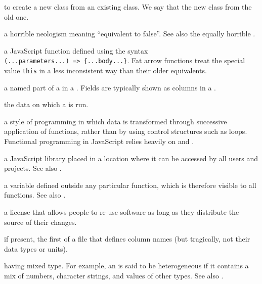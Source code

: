 \begin{description}
to create a new class from an existing class. We say that the new class
 from the old one.

a horrible neologism meaning ``equivalent to false''. See also the equally
horrible .

a JavaScript function defined using the syntax \texttt{(...parameters...)\ =\textgreater{}\ \{...body...\}}. Fat arrow functions treat the special value \texttt{this} in a less
inconsistent way than their older equivalents.

a named part of a  in a . Fields are typically shown as columns in a
.

the data on which a  is run.

a style of programming in which data is transformed through successive
application of functions, rather than by using control structures such as
loops. Functional programming in JavaScript relies heavily on
 and .

a JavaScript library placed in a location where it can be accessed by all
users and projects. See also .

a variable defined outside any particular function, which is therefore visible
to all functions. See also .

a license that allows people to re-use software as long as they distribute
the source of their changes.

if present, the first of a  file that defines column names (but
tragically, not their data types or units).

having mixed type. For example, an  is said to be
heterogeneous if it contains a mix of numbers, character strings, and values
of other types. See also .


\end{description}
